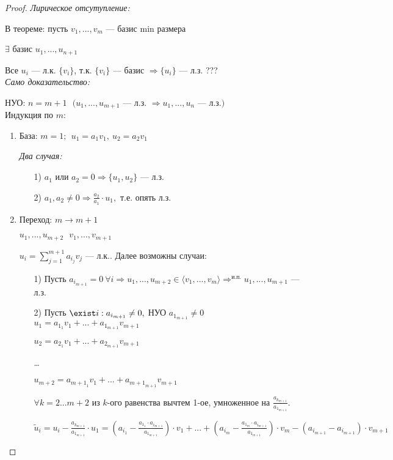 \begin{proof}
    \textit{Лирическое отсутупление:}
    
    В теореме: пусть $v_1,...,v_m$ — базис min размера 
    
    $\exists$ базис $u_1,...,u_{n+1}$ 
    
    Все $u_i$ — л.к. $\{v_i\}$, т.к. $\{v_i\}$ — базис $\Rightarrow 
\{u_i\}$ — л.з. ??? \\
    \textit{Само доказательство:}
    
    НУО: $n=m+1\ \ \ (u_1,...,u_{m+1}$ — л.з. $\Rightarrow u_1,...,u_{n}$ 
— л.з.$)$ \\
    Индукция по $m$:
    \begin{enumerate}
        \item База: $m=1;\ \ u_1=a_1v_1,\ u_2=a_2v_1$ 
        
        \textit{Два случая:}
        \begin{enumerate}
            \item[1)] $a_1$ или $a_2=0\Rightarrow \{u_1,u_2\}$ — л.з.
            \item[2)] $a_1,a_2\neq 0\Rightarrow \frac{a_2}{a_1}\cdot u_1,$ 
т.е. опять л.з.
        \end{enumerate}
        \item Переход: $m\rightarrow m+1$ 
        
        $u_1,...,u_{m+2}\ \ \ v_1,...,v_{m+1}$ 
        
        $u_i=\sum\limits_{j=1}^{m+1}a_{i_j}v_j$ — л.к.. Далее возможны 
случаи:
        \begin{enumerate}
            \item[1)] Пусть $a_{i_{m+1}}=0\ \forall i\Rightarrow 
u_1,...,u_{m+2}\in\langle 
v_1,...,v_{m}\rangle\Rightarrow^{\text{и.п.}}u_1,...,u_{m+1}$ — л.з.
            \item[2)] Пусть $\exist i:a_{i_{m+1}}\neq 0,$ НУО 
$a_{1_{m+1}}\neq0$ \\            $u_1=a_{1_1}v_1+...+a_{1_{m+1}}v_{m+1}$
            
            $u_2=a_{2_1}v_1+...+a_{2_{m+1}}v_{m+1}$
            
            …
            
            $u_{m+2}=a_{{m+1}_1}v_1+...+a_{{m+1}_{m+1}}v_{m+1}$ 
            
            $\forall k=2...m+2$ из $k$-ого равенства вычтем 1-ое, 
умноженное на $\frac{a_{k_{m+1}}}{a_{1_{m+1}}}$.
            
            $\tilde{u}_i=u_i-\frac{a_{k_{m+1}}}{a_{1_{m+1}}}\cdot 
u_1=(a_{i_1}-\frac{a_{1_1}\cdot a_{i_{m+1}}}{a_{1_{m+1}}})\cdot 
v_1+...+(a_{i_{m}}-\frac{a_{1_m}\cdot a_{i_{m+1}}}{a_{1_{m+1}}})\cdot 
v_m-(a_{i_{m+1}}-a_{i_{m+1}})\cdot v_{m+1}$
            

\end{enumerate}
\end{enumerate}
\end{proof}
